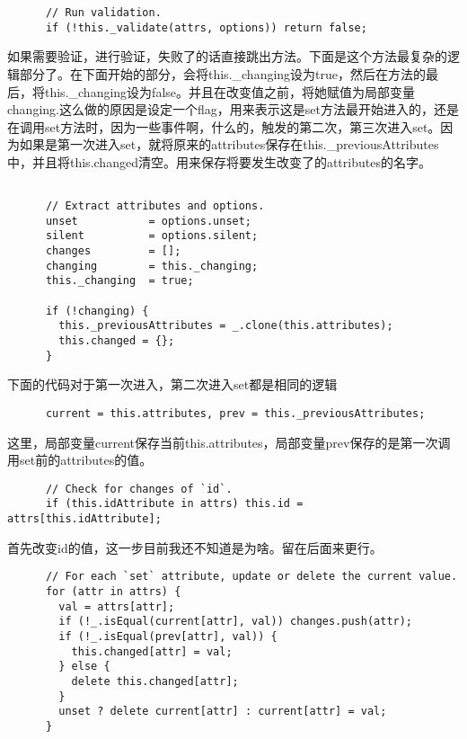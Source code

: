   \begin{lstlisting}
      // Run validation.
      if (!this._validate(attrs, options)) return false;
  \end{lstlisting}

  如果需要验证，进行验证，失败了的话直接跳出方法。下面是这个方法最复杂的逻辑部分了。在下面开始的部分，会将this.\_changing设为true，然后在方法的最后，将this.\_changing设为false。并且在改变值之前，将她赋值为局部变量changing.这么做的原因是设定一个flag，用来表示这是set方法最开始进入的，还是在调用set方法时，因为一些事件啊，什么的，触发的第二次，第三次进入set。因为如果是第一次进入set，就将原来的attributes保存在this.\_previousAttributes中，并且将this.changed清空。用来保存将要发生改变了的attributes的名字。

  \begin{lstlisting}

      // Extract attributes and options.
      unset           = options.unset;
      silent          = options.silent;
      changes         = [];
      changing        = this._changing;
      this._changing  = true;

      if (!changing) {
        this._previousAttributes = _.clone(this.attributes);
        this.changed = {};
      }

  \end{lstlisting}
  下面的代码对于第一次进入，第二次进入set都是相同的逻辑
  \begin{lstlisting}
      current = this.attributes, prev = this._previousAttributes;

  \end{lstlisting}
  这里，局部变量current保存当前this.attributes，局部变量prev保存的是第一次调用set前的attributes的值。
  \begin{lstlisting}
      // Check for changes of `id`.
      if (this.idAttribute in attrs) this.id = attrs[this.idAttribute];
  \end{lstlisting}
  首先改变id的值，这一步目前我还不知道是为啥。留在后面来更行。

  \begin{lstlisting}
      // For each `set` attribute, update or delete the current value.
      for (attr in attrs) {
        val = attrs[attr];
        if (!_.isEqual(current[attr], val)) changes.push(attr);
        if (!_.isEqual(prev[attr], val)) {
          this.changed[attr] = val;
        } else {
          delete this.changed[attr];
        }
        unset ? delete current[attr] : current[attr] = val;
      }
  \end{lstlisting}

